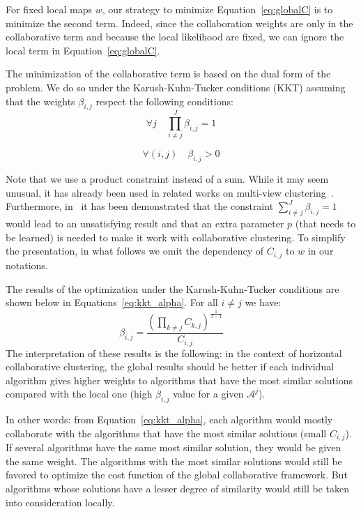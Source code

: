 For fixed local maps $w$, our strategy to minimize Equation~\eqref{eq:globalC} is to minimize the second term. Indeed, since the collaboration weights are only in the collaborative term and because the local likelihood are fixed, we can ignore the local term in Equation~\eqref{eq:globalC}.

The minimization of the collaborative term is based on the dual form of the problem. We do so under the Karush-Kuhn-Tucker conditions (KKT) 
\cite{KKT1} assuming that the weights $\beta_{i,j}$ respect the following conditions:
$$\forall j \quad \prod_{i \neq j}^J \beta_{i,j} = 1$$ 

$$\forall (i,j) \quad \beta_{i,j} >0 $$ 

Note that we use a product constraint instead of a sum. While it may seem unusual, it has already been used in related works on multi-view clustering~\cite{CarvalhoML15}. Furthermore, in~\cite{Sublime2017} it has been demonstrated that the constraint $\sum_{i \neq j}^J \beta_{i,j} = 1$ would lead to an unsatisfying result and that an extra parameter $p$ (that needs to be learned) is needed to make it work with collaborative clustering. To simplify the presentation, in what follows we omit the dependency of $C_{i,j}$ to $w$ in our notations.



The results of the optimization under the Karush-Kuhn-Tucker conditions are shown below  in Equations~\eqref{eq:kkt_alpha}. For  all  $ i \neq j$  
we have:
\begin{equation}
\beta_{i,j} =  \frac{{(\prod_{k\neq j} C _{k,j})}^{\frac 1 {J-1}}} {C _{i,j}} \qquad
\label{eq:kkt_alpha}
\end{equation} 
The interpretation of these results is the following: 
in the context of horizontal collaborative clustering, the global results should be better if each individual algorithm gives higher 
weights to algorithms that have the most similar solutions compared with the local one (high $ \beta_{i,j}$ value for a given $\mathcal{A}^j$).


In other words: from Equation~\eqref{eq:kkt_alpha}, each algorithm would mostly collaborate with the algorithms that have the most similar solutions (small $C_{i,j}$). If several algorithms have the same most similar solution, they would be given the same weight.  The algorithms with the most similar solutions would still be favored to optimize the cost function of the global collaborative framework. But algorithms whose solutions have a lesser degree of similarity would still be taken into consideration locally. 

